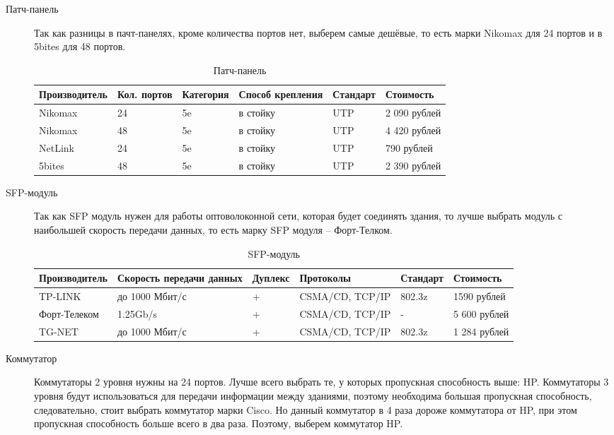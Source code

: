 \begin{description}
\item[Патч-панель]
  Так как разницы в пачт-панелях, кроме количества портов нет, выберем самые дешёвые, то есть марки Nikomax для 24 портов и в 5bites для 48 портов.
\begin{table}[!htp]
    \centering
    \begin{tabular}{|l|l|l|l|l|l|}%
      \hline
      Производитель & Кол. портов & Категория & Способ крепления & Стандарт & Стоимость \\ \hline
      Nikomax & 24 & 5e & в стойку & UTP & 2 090 рублей \\ \hline
      Nikomax & 48 & 5e & в стойку & UTP &4 420 рублей \\ \hline
      NetLink & 24 & 5e & в стойку & UTP & 790 рублей \\ \hline
      5bites &48 & 5e & в стойку & UTP & 2 390 рублей \\ \hline
    \end{tabular}
    \caption{Патч-панель}
    \label{table:patchpanel}
  \end{table}
\item[SFP-модуль]
  Так как SFP модуль нужен для работы оптоволоконной сети, которая будет соединять здания, то лучше выбрать модуль с наибольшей скорость передачи данных, то есть марку SFP модуля – Форт-Телком.
\begin{table}[!htp]
    \centering
    \begin{tabular}{|l|l|l|l|l|l|}%
      \hline
      Производитель & Скорость передачи данных & Дуплекс & Протоколы & Стандарт & Стоимость \\ \hline
      TP-LINK & до 1000 Мбит/с  & + & CSMA/CD, TCP/IP & 802.3z & 1590 рублей \\ \hline
      Форт-Телеком & 1.25Gb/s & + & CSMA/CD, TCP/IP & - &5 600 рублей \\ \hline
      TG-NET & до 1000 Мбит/с & + & CSMA/CD, TCP/IP & 802.3z & 1 284 рублей \\ \hline
    \end{tabular}
    \caption{SFP-модуль}
    \label{table:sfpmodule}
  \end{table}
\item[Коммутатор]
  Коммутаторы 2 уровня нужны на 24 портов. Лучше всего выбрать те, у которых пропускная способность выше: HP.
Коммутаторы 3 уровня будут использоваться для передачи информации между зданиями, поэтому необходима большая пропускная способность, следовательно, стоит выбрать коммутатор марки Cisco. Но данный коммутатор в 4 раза дороже коммутатора от HP, при этом пропускная способность больше всего в два раза. Поэтому, выберем коммутатор HP.

\end{description}

